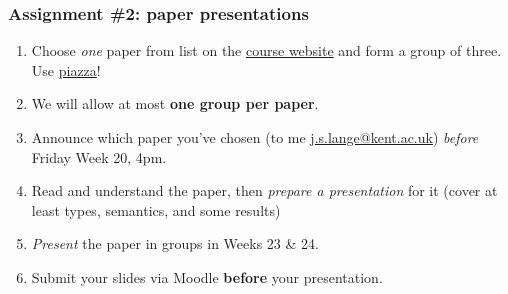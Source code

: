 \begin{frame}
  \frametitle{Assignment \#2: paper presentations}
  
  \begin{enumerate}
  \item Choose \emph{one} paper from list on the
    \href{https://rgrig.github.io/plad/essay.html}{course website} and
    form a group of three. Use \href{https://piazza.com}{piazza}!

  \item We will allow at most \textbf{one group per paper}.
 
      

  \item Announce which paper you've chosen (to me
    \href{mailto:j.s.lange@kent.ac.uk}{j.s.lange@kent.ac.uk})
    \emph{before} Friday Week 20, 4pm.
  \item Read and understand the paper, then \emph{prepare a presentation} for it
    (cover at least types, semantics, and some results)
  \item \emph{Present} the paper in groups in Weeks 23 \& 24.
  \item Submit your slides via Moodle \textbf{before} your presentation.
  \end{enumerate}
\end{frame}



